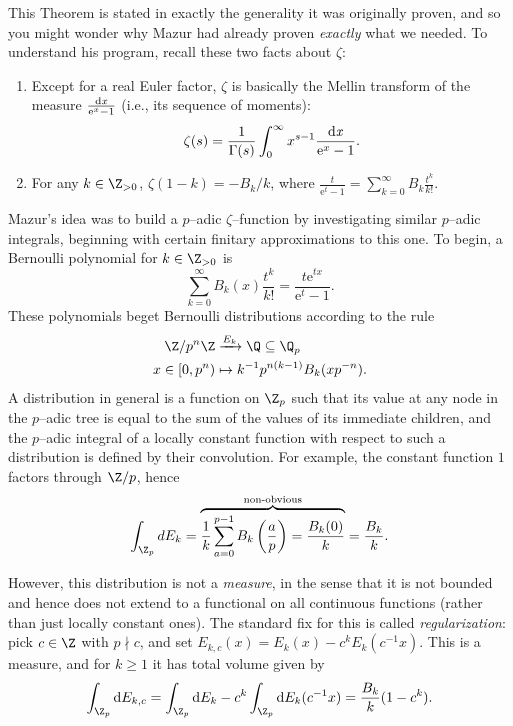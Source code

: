\noindent This Theorem is stated in exactly the generality it was originally proven, and so you might wonder why Mazur had already proven \emph{exactly} what we needed.  To understand his program, recall these two facts about \(\zeta\):
\begin{enumerate}
    \item Except for a real Euler factor, \(\zeta\) is basically the Mellin transform of the measure \(\frac{\operatorname{d\mathit{x}}}{\mathrm e^x - 1}\) (i.e., its sequence of moments): \[\zeta(s) = \frac{1}{\Gamma(s)} \int_0^\infty x^{s-1} \frac{\operatorname{d\mathit{x}}}{\mathrm e^x - 1}.\]
    \item For any \(k \in \Z_{> 0}\), \(\zeta(1 - k) = -B_k / k\), where \(\frac{t}{\mathrm e^t - 1} = \sum_{k=0}^\infty B_k \frac{t^k}{k!}\).
\end{enumerate}
Mazur's idea was to build a  \(p\)--adic \(\zeta\)--function by investigating similar \(p\)--adic integrals, beginning with certain finitary approximations to this one.  To begin, a Bernoulli polynomial for \(k \in \Z_{>0}\) is \[\sum_{k=0}^\infty B_k(x) \frac{t^k}{k!} = \frac{t \mathrm e^{tx}}{\mathrm e^t - 1}.\]  These polynomials beget Bernoulli distributions according to the rule
\begin{align*}
\Z/p^n\Z & \xrightarrow{E_k} \Q \subseteq \Q_p \\
x \in [0, p^n) & \mapsto k^{-1} p^{n(k-1)} B_k(x p^{-n}).
\end{align*}
A distribution in general is a function on \(\Z_p\) such that its value at any node in the \(p\)--adic tree is equal to the sum of the values of its immediate children, and the \(p\)--adic integral of a locally constant function with respect to such a distribution is defined by their convolution.  For example, the constant function \(1\) factors through \(\Z/p\), hence \[\int_{\Z_p} dE_k = \overset{\text{non-obvious}}{\overbrace{\frac{1}{k} \sum_{a=0}^{p-1} B_k\left(\frac{a}{p}\right) = \frac{B_k(0)}{k}}} = \frac{B_k}{k}.\]

However, this distribution is not a \emph{measure}, in the sense that it is not bounded and hence does not extend to a functional on all continuous functions (rather than just locally constant ones).  The standard fix for this is called \textit{regularization}: pick \(c \in \Z\) with \(p \nmid c\), and set \(E_{k,c}(x) = E_k(x) - c^kE_k(c^{-1}x)\).  This is a measure, and for \(k \ge 1\) it has total volume given by \[\int_{\Z_p} \mathrm dE_{k,c} = \int_{\Z_p} \mathrm dE_k - c^k \int_{\Z_p} \mathrm dE_k(c^{-1}x) = \frac{B_k}{k}(1 - c^k).\]

